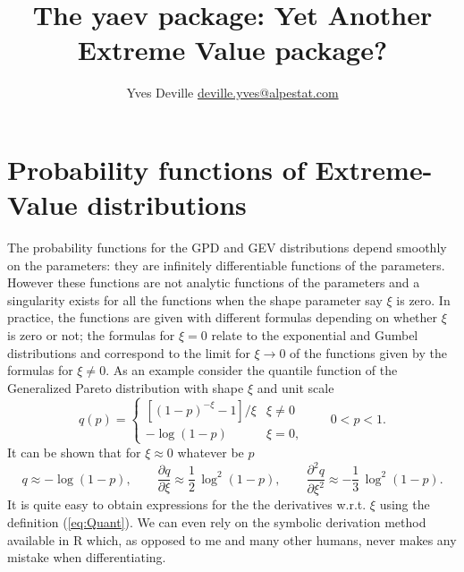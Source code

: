 \documentclass[11pt]{article}\usepackage[]{graphicx}\usepackage[]{xcolor}
\title{\bf \Large The \textbf{yaev} package: Yet Another Extreme Value package?}
\author{Yves Deville \href{mailto:deville.yves@alpestat.com}%
  {deville.yves@alpestat.com} }
\begin{document}
\maketitle{}
\tableofcontents{}

\section{Probability functions of Extreme-Value distributions}
  
The probability functions for the GPD and GEV distributions depend
smoothly on the parameters: they are infinitely differentiable
functions of the parameters. However these functions are not analytic
functions of the parameters and a singularity exists for all the
functions when the shape parameter say $\xi$ is zero.  In practice,
the functions are given with different formulas depending on whether
$\xi$ is zero or not; the formulas for $\xi = 0$ relate to the
exponential and Gumbel distributions and correspond to the limit for
$\xi \to 0$ of the functions given by the formulas for $\xi \neq 0$.
As an example consider the quantile function of the Generalized Pareto
distribution with shape $\xi$ and unit scale
\begin{equation}
\label{eq:Quant}
q(p) = \begin{cases}
  [(1 - p)^{-\xi} - 1] / \xi & \xi \neq 0 \\
  -\log(1 - p) & \xi = 0,
\end{cases} \qquad 0 < p < 1.
\end{equation}
It can be shown that for $\xi \approx 0$ whatever be $p$
$$
q \approx - \log(1-p), \qquad
\frac{\partial q}{\partial \xi} \approx \frac{1}{2}\, \log^2(1-p), \qquad
\frac{\partial^2 q}{\partial \xi^2} \approx -\frac{1}{3}\, \log^2(1-p).
$$
It is quite easy to obtain expressions for the the derivatives
w.r.t. $\xi$ using the definition (\ref{eq:Quant}). We can even rely
on the symbolic derivation method \verb@D@ available in R which, as
opposed to me and many other humans, never makes any mistake when
differentiating.
\end{document}

